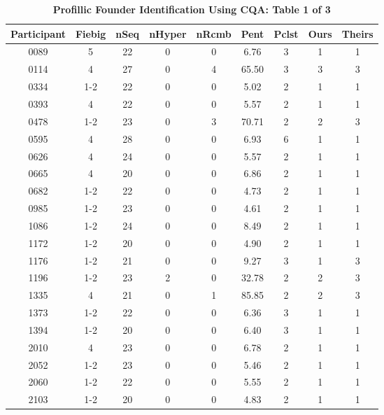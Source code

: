 \documentclass[preprint,12pt,authoryear]{elsarticle}
\begin{document}
\begin{table}
\centering
\begin{tabular}{cc | ccc | cc | cc}
  \hline
Participant & Fiebig & nSeq & nHyper & nRcmb & Pent & Pclst & Ours & Theirs \\ 
  \hline
0089 &  5 &  22 &   0 &   0 & 6.76 &   3 & 1 &   1 \\ 
  0114 &  4 &  27 &   0 &   4 & 65.50 &   3 & 3 &   3 \\ 
  0334 &  1-2 &  22 &   0 &   0 & 5.02 &   2 & 1 &   1 \\ 
  0393 &  4 &  22 &   0 &   0 & 5.57 &   2 & 1 &   1 \\ 
  0478 &  1-2 &  23 &   0 &   3 & 70.71 &   2 & 2 &   3 \\ 
  0595 &  4 &  28 &   0 &   0 & 6.93 &   6 & 1 &   1 \\ 
  0626 &  4 &  24 &   0 &   0 & 5.57 &   2 & 1 &   1 \\ 
  0665 &  4 &  20 &   0 &   0 & 6.86 &   2 & 1 &   1 \\ 
  0682 &  1-2 &  22 &   0 &   0 & 4.73 &   2 & 1 &   1 \\ 
  0985 &  1-2 &  23 &   0 &   0 & 4.61 &   2 & 1 &   1 \\ 
  1086 &  1-2 &  24 &   0 &   0 & 8.49 &   2 & 1 &   1 \\ 
  1172 &  1-2 &  20 &   0 &   0 & 4.90 &   2 & 1 &   1 \\ 
  1176 &  1-2 &  21 &   0 &   0 & 9.27 &   3 & 1 &   3 \\ 
  1196 &  1-2 &  23 &   2 &   0 & 32.78 &   2 & 2 &   3 \\ 
  1335 &  4 &  21 &   0 &   1 & 85.85 &   2 & 2 &   3 \\ 
  1373 &  1-2 &  22 &   0 &   0 & 6.36 &   3 & 1 &   1 \\ 
  1394 &  1-2 &  20 &   0 &   0 & 6.40 &   3 & 1 &   1 \\ 
  2010 &  4 &  23 &   0 &   0 & 6.78 &   2 & 1 &   1 \\ 
  2052 &  1-2 &  23 &   0 &   0 & 5.46 &   2 & 1 &   1 \\ 
  2060 &  1-2 &  22 &   0 &   0 & 5.55 &   2 & 1 &   1 \\ 
  2103 &  1-2 &  20 &   0 &   0 & 4.83 &   2 & 1 &   1 \\ 
   \hline
\end{tabular}
\caption{\textbf{Profillic Founder Identification Using CQA: Table 1 of 3}}
\label{tbl:AbrahamsFoundersVsProfillicFounders-a}
\end{table}
\end{document}
